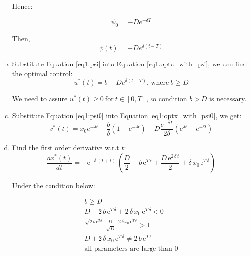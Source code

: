 \documentclass{article}
\begin{document}
\begin{enumerate}[a)]
    Hence:

    \begin{equation}\label{eq1:psi0}
        \psi_0=-De^{-\delta T}
    \end{equation}

    Then,
    \begin{equation}\label{eq1:psi}
        \psi(t)=-De^{\delta (t-T)}
    \end{equation}

    \item Substitute Equation \eqref{eq1:psi} into Equation \eqref{eq1:optc_with_psi}, we can find the optimal control:
    \begin{equation}
        u^*(t)=b-De^{\delta (t-T)},\ \text{where}\ b\geq D
    \end{equation}

    We need to assure $u^*(t)\geq 0\ \text{for}\ t\in[0,T]$, so condition $b>D$ is necessary.

    \item Substitute Equation \eqref{eq1:psi0} into Equation \eqref{eq1:optx_with_psi0}, we get:
    \begin{equation}\label{eq1:optx}
        x^*(t)=x_0e^{-\delta t}+\frac{b}{\delta}(1-e^{-\delta t})-D\frac{e^{-\delta T}}{2\delta}(e^{\delta t}-e^{-\delta t})
    \end{equation}


    \item  Find the first order derivative w.r.t $t$:
    \begin{equation}\label{eq1:optx_d}
        \frac{dx^*(t)}{dt}=-{\mathrm{e}}^{-\delta \,\left(T+t\right)}\,\left(\frac{D}{2}-b\,{\mathrm{e}}^{T\,\delta }+\frac{D\,{\mathrm{e}}^{2\,\delta \,t}}{2}+\delta \,x_{0}\,{\mathrm{e}}^{T\,\delta }\right)
    \end{equation}

    Under the condition below:

    \begin{equation}\label{conditions:model1}
        \begin{split}
            b\geq D\\
            D-2\,b\,{\mathrm{e}}^{T\,\delta }+2\,\delta \,x_{0}\,{\mathrm{e}}^{T\,\delta }<0\\
            \frac{\sqrt{2\,b\,{\mathrm{e}}^{T\,\delta }-D-2\,\delta \,x_{0}\,{\mathrm{e}}^{T\,\delta }}}{\sqrt{D}}>1\\
            D+2\,\delta \,x_{0}\,{\mathrm{e}}^{T\,\delta }\neq 2\,b\,{\mathrm{e}}^{T\,\delta }\\
            \text{all parameters are large than 0}
        \end{split}
    \end{equation}


\end{enumerate}
\end{document}
